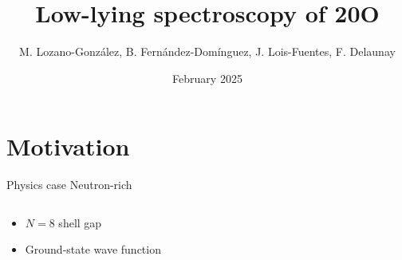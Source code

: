 \documentclass[aspectratio=43, dvipsnames]{beamer}
\title[Oxygen spectroscopy]{Low-lying spectroscopy of 20O}
\date[Feb 2025]{February 2025}
\author[M. Lozano et al.]{M. Lozano-González, B. Fernández-Domínguez, \texorpdfstring{\newline}{} J. Lois-Fuentes, F. Delaunay}
\institute{USC-IGFAE and LPC-Caen}
\newcommand{\iso}[2]{\ce{^{#1}#2}}
\begin{document}
\maketitle

\section{Motivation}
\begin{frame}{Physics case}
	Neutron-rich \iso{20}{O}
	\begin{columns}[c]
		\begin{column}{0.5\linewidth}
			\begin{itemize}
				\item $N = 8$ shell gap
				\item Ground-state wave function
			\end{itemize}
		\end{column}%
		\begin{column}{0.5\linewidth}
		\end{column}
	\end{columns}
\end{frame}
\end{document}
